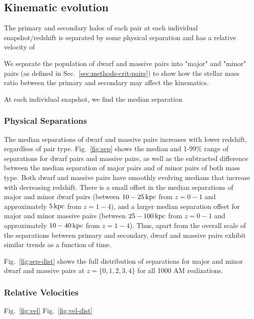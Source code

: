 \documentclass[twocolumn]{aastex631}
\begin{document}
\subsection{Kinematic evolution}\label{sec:results-kinematics}
The primary and secondary halos of each pair at each individual snapshot/redshift is separated by some physical separation and has a relative velocity of 

We separate the population of dwarf and massive pairs into "major" and "minor" pairs (as defined in Sec.~\ref{sec:methods-crit-pairs}) to show how the stellar mass ratio between the primary and secondary may affect the kinematics. 

At each individual snapshot, we find the median separation 

\subsubsection{Physical Separations}
The median separations of dwarf and massive pairs increases with lower redshift, regardless of pair type. 
Fig.~\ref{fig:sep} shows the median and 1-99\% range of separations for dwarf pairs and massive pairs, as well as the subtracted difference between the median separation of major pairs and of minor pairs of both mass type. 
Both dwarf and massive pairs have smoothly evolving medians that increase with decreasing redshift. 
There is a small offset in the median separations of major and minor dwarf pairs (between $10-25\,\mathrm{kpc}$ from  $z=0-1$ and approximately $5\,\mathrm{kpc}$ from $z=1-4$), and a larger median separation offset for major and minor massive pairs (between $25-100\,\mathrm{kpc}$ from  $z=0-1$ and approximately $10-40\,\mathrm{kpc}$ from $z=1-4$). 
Thus, apart from the overall scale of the separations between primary and secondary, dwarf and massive pairs exhibit similar trends as a function of time. 

Fig.~\ref{fig:sep-dist} shows the full distribution of separations for major and minor dwarf and massive pairs at $z=\{0,1,2,3,4\}$ for all 1000 AM realizations. 


\subsubsection{Relative Velocities}
Fig.~\ref{fig:vel}
Fig.~\ref{fig:vel-dist}
\end{document}
